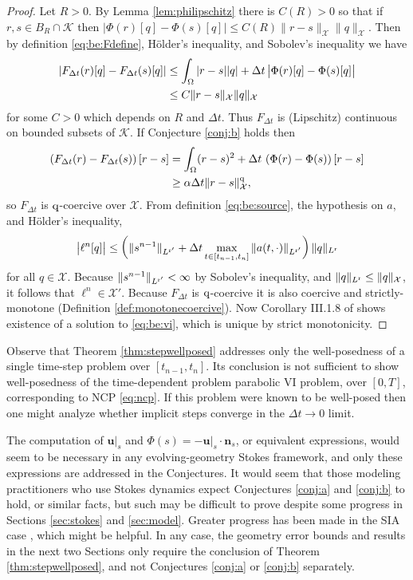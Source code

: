 \documentclass[hidelinks,onefignum,onetabnum,final]{siamart220329}  %
\newcommand{\bn}{\mathbf{n}}
\newcommand{\bu}{\mathbf{u}}
\newcommand{\cK}{\mathcal{K}}
\newcommand{\cX}{\mathcal{X}}
\newcommand{\qq}{{\text{\textnormal{q}}}}
\newcommand{\rr}{{\text{\textnormal{r}}}}
\begin{document}
\begin{proof}  Let $R>0$.  By Lemma \ref{lem:philipschitz} there is $C(R)>0$ so that if $r,s\in B_R\cap\cK$ then $\big|\Phi(r)[q] - \Phi(s)[q]\big| \le C(R) \|r-s\|_{\cX} \|q\|_{\cX}$.  Then by definition \eqref{eq:be:Fdefine}, H\"older's inequality, and Sobolev's inequality we have
\begin{align}
\left|F_{\Delta t}(r)[q] - F_{\Delta t}(s)[q]\right| &\le \int_\Omega |r-s||q| + \Delta t\, \big|\Phi(r)[q] - \Phi(s)[q]\big| \\
    &\le C \|r-s\|_{\cX} \|q\|_\cX \notag
\end{align}
for some $C>0$ which depends on $R$ and $\Delta t$.  Thus $F_{\Delta t}$ is (Lipschitz) continuous on bounded subsets of $\cK$.  If Conjecture \ref{conj:b} holds then
\begin{align}
\left(F_{\Delta t}(r) - F_{\Delta t}(s)\right)[r-s] &= \int_\Omega (r-s)^2 + \Delta t\, \left(\Phi(r) - \Phi(s)\right)[r-s] \\
    &\ge \alpha\Delta t \|r-s\|_{\cX}^\qq, \notag
\end{align}
so $F_{\Delta t}$ is $\qq$-coercive over $\cX$.  From definition \eqref{eq:be:source}, the hypothesis on $a$, and H\"older's inequality,
\begin{equation}
\big|\ell^n[q]\big| \le \left(\|s^{n-1}\|_{L^{\rr'}} + \Delta t \max_{t\in[t_{n-1},t_n]} \|a(t,\cdot)\|_{L^{\rr'}}\right) \|q\|_{L^\rr}
\label{eq:sourcetermbound}
\end{equation}
for all $q \in \cX$.  Because $\|s^{n-1}\|_{L^{\rr'}}<\infty$ by Sobolev's inequality, and $\|q\|_{L^\rr} \le \|q\|_{\cX}$, it follows that $\ell^n \in \cX'$.  Because $F_{\Delta t}$ is $\qq$-coercive it is also coercive and strictly-monotone (Definition \ref{def:monotonecoercive}).  Now Corollary III.1.8 of \cite{KinderlehrerStampacchia1980} shows existence of a solution to \eqref{eq:be:vi}, which is unique by strict monotonicity.
\end{proof}

Observe that Theorem \ref{thm:stepwellposed} addresses only the well-posedness of a single time-step problem over $[t_{n-1},t_n]$.  Its conclusion is not sufficient to show well-posedness of the time-dependent problem parabolic VI problem, over $[0,T]$, corresponding to NCP \eqref{eq:ncp}.  If this problem were known to be well-posed then one might analyze whether implicit steps converge in the $\Delta t\to 0$ limit.

The computation of $\bu|_s$ and $\Phi(s)=-\bu|_s\cdot \bn_s$, or equivalent expressions, would seem to be necessary in any evolving-geometry Stokes framework, and only these expressions are addressed in the Conjectures.  It would seem that those modeling practitioners who use Stokes dynamics expect Conjectures \ref{conj:a} and \ref{conj:b} to hold, or similar facts, but such may be difficult to prove despite some progress in Sections \ref{sec:stokes} and \ref{sec:model}.  Greater progress has been made in the SIA case \cite{Calvoetal2003,JouvetBueler2012,PiersantiTemam2023}, which might be helpful.  In any case, the geometry error bounds and results in the next two Sections only require the conclusion of Theorem \ref{thm:stepwellposed}, and not Conjectures \ref{conj:a} or \ref{conj:b} separately.
\end{document}

